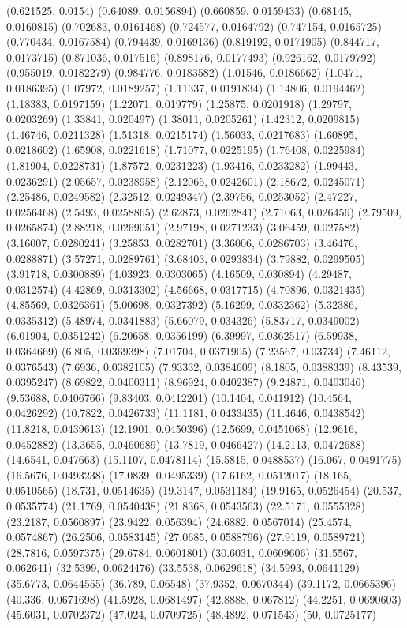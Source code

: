 {(0.621525, 0.0154)
(0.64089, 0.0156894)
(0.660859, 0.0159433)
(0.68145, 0.0160815)
(0.702683, 0.0161468)
(0.724577, 0.0164792)
(0.747154, 0.0165725)
(0.770434, 0.0167584)
(0.794439, 0.0169136)
(0.819192, 0.0171905)
(0.844717, 0.0173715)
(0.871036, 0.017516)
(0.898176, 0.0177493)
(0.926162, 0.0179792)
(0.955019, 0.0182279)
(0.984776, 0.0183582)
(1.01546, 0.0186662)
(1.0471, 0.0186395)
(1.07972, 0.0189257)
(1.11337, 0.0191834)
(1.14806, 0.0194462)
(1.18383, 0.0197159)
(1.22071, 0.019779)
(1.25875, 0.0201918)
(1.29797, 0.0203269)
(1.33841, 0.020497)
(1.38011, 0.0205261)
(1.42312, 0.0209815)
(1.46746, 0.0211328)
(1.51318, 0.0215174)
(1.56033, 0.0217683)
(1.60895, 0.0218602)
(1.65908, 0.0221618)
(1.71077, 0.0225195)
(1.76408, 0.0225984)
(1.81904, 0.0228731)
(1.87572, 0.0231223)
(1.93416, 0.0233282)
(1.99443, 0.0236291)
(2.05657, 0.0238958)
(2.12065, 0.0242601)
(2.18672, 0.0245071)
(2.25486, 0.0249582)
(2.32512, 0.0249347)
(2.39756, 0.0253052)
(2.47227, 0.0256468)
(2.5493, 0.0258865)
(2.62873, 0.0262841)
(2.71063, 0.026456)
(2.79509, 0.0265874)
(2.88218, 0.0269051)
(2.97198, 0.0271233)
(3.06459, 0.027582)
(3.16007, 0.0280241)
(3.25853, 0.0282701)
(3.36006, 0.0286703)
(3.46476, 0.0288871)
(3.57271, 0.0289761)
(3.68403, 0.0293834)
(3.79882, 0.0299505)
(3.91718, 0.0300889)
(4.03923, 0.0303065)
(4.16509, 0.030894)
(4.29487, 0.0312574)
(4.42869, 0.0313302)
(4.56668, 0.0317715)
(4.70896, 0.0321435)
(4.85569, 0.0326361)
(5.00698, 0.0327392)
(5.16299, 0.0332362)
(5.32386, 0.0335312)
(5.48974, 0.0341883)
(5.66079, 0.034326)
(5.83717, 0.0349002)
(6.01904, 0.0351242)
(6.20658, 0.0356199)
(6.39997, 0.0362517)
(6.59938, 0.0364669)
(6.805, 0.0369398)
(7.01704, 0.0371905)
(7.23567, 0.03734)
(7.46112, 0.0376543)
(7.6936, 0.0382105)
(7.93332, 0.0384609)
(8.1805, 0.0388339)
(8.43539, 0.0395247)
(8.69822, 0.0400311)
(8.96924, 0.0402387)
(9.24871, 0.0403046)
(9.53688, 0.0406766)
(9.83403, 0.0412201)
(10.1404, 0.041912)
(10.4564, 0.0426292)
(10.7822, 0.0426733)
(11.1181, 0.0433435)
(11.4646, 0.0438542)
(11.8218, 0.0439613)
(12.1901, 0.0450396)
(12.5699, 0.0451068)
(12.9616, 0.0452882)
(13.3655, 0.0460689)
(13.7819, 0.0466427)
(14.2113, 0.0472688)
(14.6541, 0.047663)
(15.1107, 0.0478114)
(15.5815, 0.0488537)
(16.067, 0.0491775)
(16.5676, 0.0493238)
(17.0839, 0.0495339)
(17.6162, 0.0512017)
(18.165, 0.0510565)
(18.731, 0.0514635)
(19.3147, 0.0531184)
(19.9165, 0.0526454)
(20.537, 0.0535774)
(21.1769, 0.0540438)
(21.8368, 0.0543563)
(22.5171, 0.0555328)
(23.2187, 0.0560897)
(23.9422, 0.056394)
(24.6882, 0.0567014)
(25.4574, 0.0574867)
(26.2506, 0.0583145)
(27.0685, 0.0588796)
(27.9119, 0.0589721)
(28.7816, 0.0597375)
(29.6784, 0.0601801)
(30.6031, 0.0609606)
(31.5567, 0.062641)
(32.5399, 0.0624476)
(33.5538, 0.0629618)
(34.5993, 0.0641129)
(35.6773, 0.0644555)
(36.789, 0.06548)
(37.9352, 0.0670344)
(39.1172, 0.0665396)
(40.336, 0.0671698)
(41.5928, 0.0681497)
(42.8888, 0.067812)
(44.2251, 0.0690603)
(45.6031, 0.0702372)
(47.024, 0.0709725)
(48.4892, 0.071543)
(50, 0.0725177)
}

